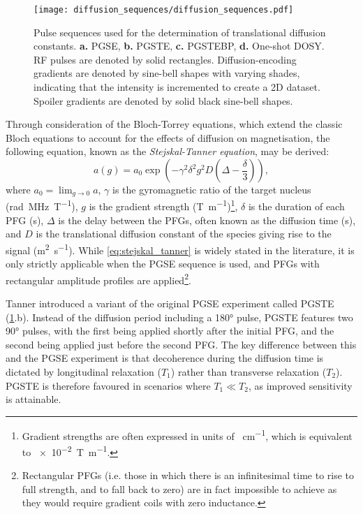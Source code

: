\begin{figure}
   \texttt{[image: diffusion\_sequences/diffusion\_sequences.pdf]}
   \caption[
       Pulse sequences used for the determination of translational diffusion constants.
   ]{
       Pulse sequences used for the determination of translational diffusion constants.
       \textbf{a.} \acs{PGSE},
       \textbf{b.} \acs{PGSTE},
       \textbf{c.} \acs{PGSTEBP},
       \textbf{d.} One-shot DOSY.
       \ac{RF} pulses are denoted by solid rectangles. Diffusion-encoding
       gradients are denoted by sine-bell shapes with varying shades,
       indicating that the intensity is incremented to create a \ac{2D}
       dataset. Spoiler gradients are denoted by solid black sine-bell shapes.
   }
   \label{fig:diffusion_sequences}
\end{figure}

Through consideration of the Bloch-Torrey equations\cite{Torrey1956}, which
extend the classic Bloch equations to account for the effects of diffusion on
magnetisation, the following equation, known as the \emph{Stejskal-Tanner
equation}, may be derived:
\begin{equation}
    a(g) = a_0 \exp \left(- \gamma^2 \delta^2 g^2 D \left(\Delta -
    \frac{\delta}{3}\right)\right),
    \label{eq:stejskal_tanner}
\end{equation}
where
$a_0 = \lim_{g \rightarrow 0} a$,
$\gamma$ is the gyromagnetic ratio of the target nucleus
(\unit{\radian \mega\hertz\per\tesla}),
$g$ is the gradient strength (\unit{\tesla\per\meter})\footnote{
    Gradient strengths are often expressed in units of
    \unit{\gauss\per\centi\meter}, which is equivalent to
    \qty[print-unity-mantissa = false]{e-2}{\tesla\per\meter}.
},
$\delta$ is the duration of each \ac{PFG} (\unit{\second}),
$\Delta$ is the delay between the \acp{PFG}, often known as the diffusion time
(\unit{\second}),
and $D$ is the translational diffusion constant of the species giving rise to
the signal (\unit{\meter\squared\per\second}).
While \cref{eq:stejskal_tanner} is widely stated in the literature, it is only
strictly applicable when the \ac{PGSE} sequence is used, and \acp{PFG} with
rectangular amplitude profiles are applied\footnote{
    Rectangular \acp{PFG} (i.e. those in which there is an infinitesimal time
    to rise to full strength, and to fall back to zero) are in fact
    impossible to achieve as they would require gradient coils with zero
    inductance.
}.

Tanner introduced a variant of the original \ac{PGSE} experiment called
\ac{PGSTE}\cite{Tanner1970} (\cref{fig:diffusion_sequences}.b). Instead
of the diffusion period including a
\ang{180} pulse, \ac{PGSTE} features two \ang{90} pulses, with the first being
applied shortly after the initial \ac{PFG}, and the second being applied just
before the second \ac{PFG}. The key difference between this and the \ac{PGSE}
experiment is that decoherence during the diffusion time is
dictated by longitudinal relaxation ($T_1$) rather than transverse relaxation
($T_2$). \ac{PGSTE} is therefore favoured in scenarios where $T_1 \ll T_2$, as
improved sensitivity is attainable.


